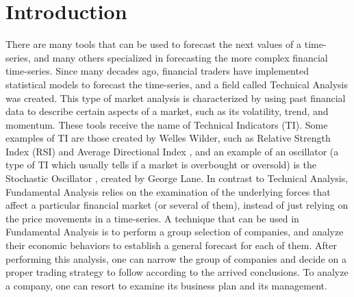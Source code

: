 \section{Introduction}

There are many tools that can be used to forecast the next values of a time-series, and many others specialized in forecasting the more complex financial time-series. Since many decades ago, financial traders have implemented statistical models to forecast the time-series, and a field called Technical Analysis was created. This type of market analysis is characterized by using past financial data to describe certain aspects of a market, such as its volatility, trend, and momentum. These tools receive the name of Technical Indicators (TI). Some examples of TI are those created by Welles Wilder, such as Relative Strength Index (RSI) and Average Directional Index \cite{wilder1978new}, and an example of an oscillator (a type of TI which usually tells if a market is overbought or oversold) is the Stochastic Oscillator \cite{schirding1984stochastic}, created by George Lane. In contrast to Technical Analysis, Fundamental Analysis relies on the examination of the underlying forces that affect a particular financial market (or several of them), instead of just relying on the price movements in a time-series. A technique that can be used in Fundamental Analysis is to perform a group selection of companies, and analyze their economic behaviors to establish a general forecast for each of them. After performing this analysis, one can narrow the group of companies and decide on a proper trading strategy to follow according to the arrived conclusions. To analyze a company, one can resort to examine its business plan and its management.

